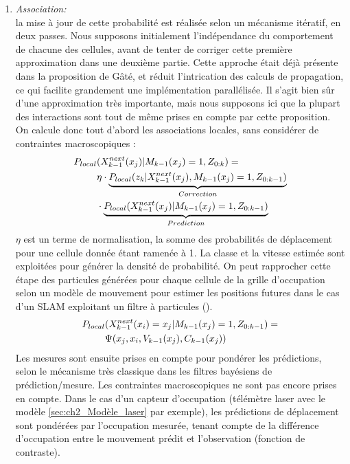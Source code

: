 \begin{enumerate}
	\item{\emph{Association:\\}}
	la mise à jour de cette probabilité est réalisée selon un mécanisme itératif, en deux passes. Nous supposons initialement l'indépendance du comportement de chacune des cellules, avant de tenter de corriger cette première approximation dans une deuxième partie. Cette approche était déjà présente dans la proposition de Gâté, et réduit l'intrication des calculs de propagation, ce qui facilite grandement une implémentation parallélisée. Il s'agit bien sûr d'une approximation très importante, mais nous supposons ici que la plupart des interactions sont tout de même prises en compte par cette proposition. \\
	On calcule donc tout d'abord les associations locales, sans considérer de contraintes macroscopiques :
	\begin{align}
		P_{local} &(X_{k-1}^{next}(x_j) | M_{k-1}(x_j)=1, Z_{0:k} ) = \notag \\
		&\eta  \cdot \underbrace{ P_{local}(z_k | X_{k-1}^{next}(x_j),  M_{k-1}(x_j)=1,  Z_{0:k-1} )}_{Correction} \notag \\
		&\cdot \underbrace{ P_{local}(X_{k-1}^{next}(x_j)  | M_{k-1}(x_j)=1,  Z_{0:k-1} ) }_{Prediction}
	\end{align}
	$\eta$ est un terme de normalisation, la somme des probabilités de déplacement pour une cellule donnée étant ramenée à 1. La classe et la vitesse estimée sont exploitées pour générer la densité de probabilité. On peut rapprocher cette étape des particules générées pour chaque cellule de la grille d'occupation selon un modèle de mouvement pour estimer les positions futures dans le cas d'un SLAM exploitant un filtre à particules (\cite{Thrun2004a}). 
	\begin{align}
		P_{local} &(X_{k-1}^{next}(x_i) = x_j | M_{k-1}(x_j)=1,  Z_{0:k-1} ) =  \notag \\
		& \Psi (x_j, x_i, V_{k-1}(x_j), C_{k-1}(x_j))
	\end{align}
	Les mesures sont ensuite prises en compte pour pondérer les prédictions, selon le mécanisme très classique dans les filtres bayésiens de prédiction/mesure. Les contraintes macroscopiques ne sont pas encore prises en compte. Dans le cas d'un capteur d'occupation (télémètre laser avec le modèle \ref{sec:ch2_Modèle_laser} par exemple), les prédictions de déplacement sont pondérées par l'occupation mesurée, tenant compte de la différence d'occupation entre le mouvement prédit et l'observation (fonction de contraste).\\

\end{enumerate}
